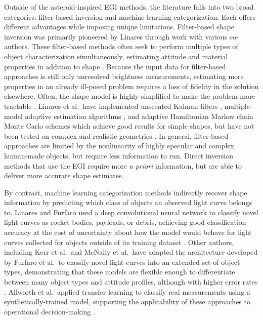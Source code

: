 Outside of the asteroid-inspired EGI methods, the literature falls into two broad categories: filter-based inversion and machine learning categorization. Each offers different advantages while imposing unique limitations. Filter-based shape inversion was primarily pioneered by Linares through work with various co-authors. These filter-based methods often seek to perform multiple types of object characterization simultaneously, estimating attitude and material properties in addition to shape \cite{linares2012, linares2014space, linares2018space}. Because the input data for filter-based approaches is still only unresolved brightness measurements, estimating more properties in an already ill-posed problem requires a loss of fidelity in the solution elsewhere. Often, the shape model is highly simplified to make the problem more tractable \cite{linares2012, linares2014space, linares2018space}. Linares et al.\ have implemented unscented Kalman filters \cite{linares2012}, multiple-model adaptive estimation algorithms \cite{linares2014space}, and adaptive Hamiltonian Markov chain Monte Carlo schemes \cite{linares2018space} which achieve good results for simple shapes, but have not been tested on complex and realistic geometries \cite{linares2018space}. In general, filter-based approaches are limited by the nonlinearity of highly specular and complex human-made objects, but require less information to run. Direct inversion methods that use the EGI require more \textit{a priori} information, but are able to deliver more accurate shape estimates.

By contrast, machine learning categorization methods indirectly recover shape information by predicting which class of objects an observed light curve belongs to. Linares and Furfaro used a deep convolutional neural network to classify novel light curves as rocket bodies, payloads, or debris, achieving good classification accuracy at the cost of uncertainty about how the model would behave for light curves collected for objects outside of its training dataset \cite{linares2016}. Other authors, including Kerr et al.\ and McNally et al.\ have adapted the architecture developed by Furfaro et al.\ to classify novel light curves into an extended set of object types, demonstrating that these models are flexible enough to differentiate between many object types and attitude profiles, although with higher error rates \cite{kerr2021, mcnally2021}. Allworth et al.\ applied transfer learning to classify real measurements using a synthetically-trained model, supporting the applicability of these approaches to operational decision-making \cite{allworth2021}.


